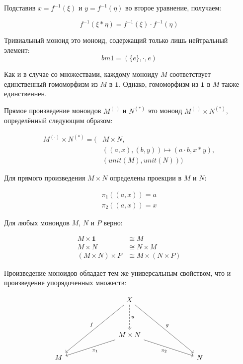 \documentclass[10pt, a4paper]{article}
\theoremstyle{colon}
\begin{document}
Подставив \( x = f^{-1}(\xi) \) и \( y = f^{-1}(\eta) \) во второе
уравнение, получаем:

\[
f^{-1}(\xi * \eta) = f^{-1}(\xi) \cdot f^{-1}(\eta)
\]

Тривиальный моноид это моноид, содержащий только лишь нейтральный элемент:
\[bm 1 = (\{e\}, {\cdot}, e)\]

Как и в случае со множествами, каждому моноиду \( M \) соответствует единственный
гомоморфизм из \( M \) в \( \bm 1 \). Однако, гомоморфизм из \( \bm 1 \)
в \( M \) также единственнен.

Прямое произведение моноидов \( M^{(\cdot)} \) и \( N^{(*)} \) это
моноид \( M^{(\cdot)} \times N^{(*)} \), определённый следующим образом:

\begin{align*}
M^{(\cdot)} \times N^{(*)} = (
  &M \times N, \\
  &((a, x), (b, y)) \mapsto (a \cdot b, x * y), \\
  &(unit(M), unit(N))
)
\end{align*}

Для прямого произведения \( M\times N \) определены проекции в \( M \)
и \( N \):

\begin{align*}
\pi_1((a, x)) = a \\
\pi_2((a, x)) = x
\end{align*}

Для любых моноидов \( M \), \( N \) и \( P \) верно:

\begin{align*}
M \times \bm 1 &\cong M \\
M \times N &\cong N \times M \\
(M \times N) \times P &\cong M \times (N \times P)
\end{align*}

Произведение моноидов обладает тем же универсальным свойством, что и произведение упорядоченных множеств:

\[\begin{tikzcd}
	&&& X \\
	\\
	&&& {M\times N} \\
	M &&&&&& N
	\arrow["u", dashed, from=1-4, to=3-4]
	\arrow["{\pi_1}", from=3-4, to=4-1]
	\arrow["{\pi_2}"', from=3-4, to=4-7]
	\arrow["g", from=1-4, to=4-7]
	\arrow["f"', from=1-4, to=4-1]
\end{tikzcd}\]
\end{document}
